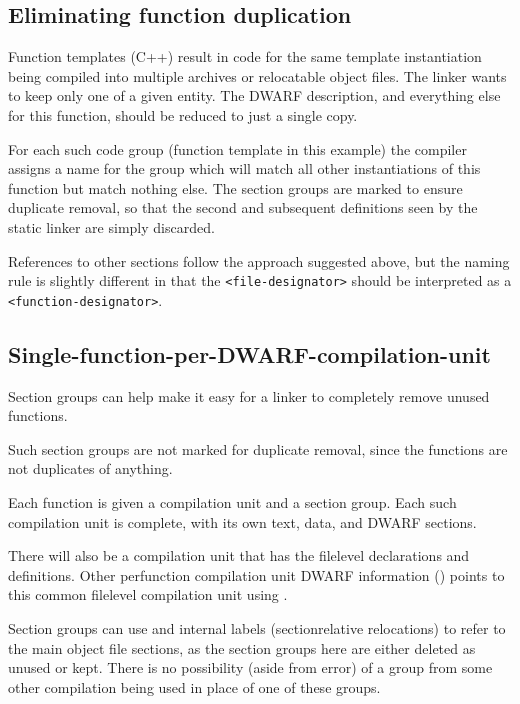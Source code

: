 \subsection{Eliminating function duplication}
\label{app:eliminatingfunctionduplication}


Function templates (C++) result in code for the same template
instantiation being compiled into multiple archives or
relocatable object files. The linker wants to keep only one of a
given entity. The DWARF description, and everything else for
this function, should be reduced to just a single copy.

For each such code group (function template in this example)
the compiler assigns a name for the group which will match
all other instantiations of this function but match nothing
else. 
The 
section groups are marked to ensure duplicate
removal, so that the second and subsequent definitions seen
by the static linker are simply discarded.


References to other 
\dotdebuginfo{} sections follow the approach
suggested above, but the naming rule is slightly
different in that the \texttt{\textless file-designator\textgreater} 
should be interpreted as a 
\bb
\texttt{\textless function-designator\textgreater}.
\eb


\subsection{Single-function-per-DWARF-compilation-unit}
\label{app:singlefunctionperdwarfcompilationunit}

Section groups can help make it easy for a linker to completely
remove unused functions.

Such 
section groups are not marked for duplicate removal,
since the functions are not duplicates of anything.

Each function is given a compilation unit and a section
group. Each such compilation unit is complete, with its own
text, data, and DWARF sections.

There will also be a compilation unit that has the file\dash level
declarations and definitions. Other per\dash function compilation
unit DWARF information (\dotdebuginfo{}) points to this common
file\dash level compilation unit using 
\DWTAGimportedunit.

Section groups can use \DWFORMrefaddr{} and internal labels
(section\dash relative relocations) to refer to the main object
file sections, as the 
section groups here are either deleted
as unused or kept. There is no possibility (aside from error)
of a group from some other compilation being used in place
of one of these groups.


